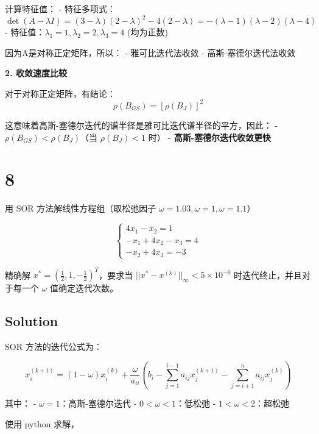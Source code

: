 \documentclass[11pt]{article}
\begin{document}
计算特征值： -
特征多项式：\(\det(A - \lambda I) = (3-\lambda)(2-\lambda)^2 - 4(2-\lambda) = -(λ-1)(λ-2)(λ-4)\)
- 特征值：\(\lambda_1 = 1, \lambda_2 = 2, \lambda_3 = 4\) (均为正数)

因为A是对称正定矩阵，所以： - 雅可比迭代法收敛 - 高斯-塞德尔迭代法收敛

\textbf{2. 收敛速度比较}

对于对称正定矩阵，有结论： \[\rho(B_{GS}) = [\rho(B_J)]^2\]

这意味着高斯-塞德尔迭代的谱半径是雅可比迭代谱半径的平方，因此： -
\(\rho(B_{GS}) < \rho(B_J)\)（当 \(\rho(B_J) < 1\) 时） -
\textbf{高斯-塞德尔迭代收敛更快}

    \section{8}\label{section}

用 SOR 方法解线性方程组（取松弛因子
\(\omega = 1.03, \omega = 1, \omega = 1.1\)）

\[
\begin{cases}
4x_1 - x_2 = 1 \\
-x_1 + 4x_2 - x_3 = 4 \\
-x_2 + 4x_3 = -3
\end{cases}
\]

精确解 \(x^* = (\frac{1}{2}, 1, -\frac{1}{2})^T\)，要求当
\(||x^{*} - x^{(k)}||_{\infty} < 5\times 10^{-6}\)
时迭代终止，并且对于每一个 \(\omega\) 值确定迭代次数。

    \subsection{Solution}\label{solution}

SOR 方法的迭代公式为：

\[x_i^{(k+1)} = (1-\omega)x_i^{(k)} + \frac{\omega}{a_{ii}}\left(b_i - \sum_{j=1}^{i-1}a_{ij}x_j^{(k+1)} - \sum_{j=i+1}^{n}a_{ij}x_j^{(k)}\right)\]

其中： - \(\omega = 1\)：高斯-塞德尔迭代 - \(0 < \omega < 1\)：低松弛 -
\(1 < \omega < 2\)：超松弛

使用 python 求解，
\end{document}
